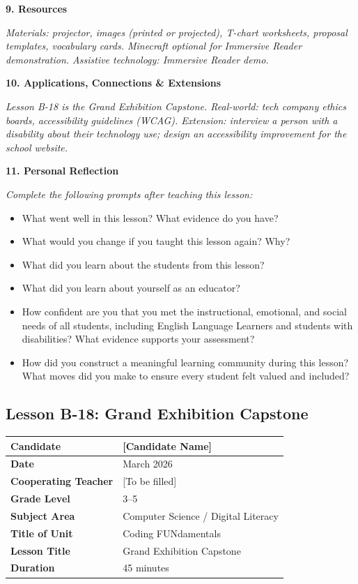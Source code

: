 \documentclass[11pt,letterpaper]{article}
\begin{document}
\textbf{9. Resources}

\textit{Materials: projector, images (printed or projected), T-chart worksheets, proposal templates, vocabulary cards. Minecraft optional for Immersive Reader demonstration. Assistive technology: Immersive Reader demo.}

\textbf{10. Applications, Connections \& Extensions}

\textit{Lesson B-18 is the Grand Exhibition Capstone. Real-world: tech company ethics boards, accessibility guidelines (WCAG). Extension: interview a person with a disability about their technology use; design an accessibility improvement for the school website.}

\textbf{11. Personal Reflection}

\textit{Complete the following prompts after teaching this lesson:}

\begin{itemize}
  \item What went well in this lesson? What evidence do you have?

  \item What would you change if you taught this lesson again? Why?

  \item What did you learn about the students from this lesson?

  \item What did you learn about yourself as an educator?

  \item How confident are you that you met the instructional, emotional, and social needs of all students, including English Language Learners and students with disabilities? What evidence supports your assessment?

  \item How did you construct a meaningful learning community during this lesson? What moves did you make to ensure every student felt valued and included?
\end{itemize}

\newpage
\subsection{Lesson B-18: Grand Exhibition Capstone}
\label{sub:LessonB18GrandExhibitionCapstone}

\begin{longtable}{|L{0.28\textwidth}|L{0.65\textwidth}|}
\hline
\textbf{Candidate}  & [Candidate Name]  \\
\hline
\textbf{Date}  & March 2026  \\
\hline
\textbf{Cooperating Teacher}  & [To be filled]  \\
\hline
\textbf{Grade Level}  & 3--5  \\
\hline
\textbf{Subject Area}  & Computer Science / Digital Literacy  \\
\hline
\textbf{Title of Unit}  & Coding FUNdamentals  \\
\hline
\textbf{Lesson Title}  & Grand Exhibition Capstone  \\
\hline
\textbf{Duration}  & 45 minutes  \\
\hline
\end{longtable}
\end{document}
